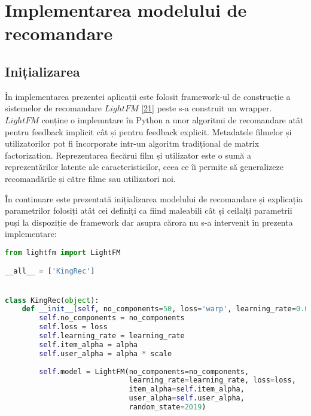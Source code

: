 \section{Implementarea modelului de recomandare}
\subsection{Inițializarea}
În implementarea prezentei aplicații este folosit framework-ul de construcție a sistemelor de recomandare $LightFM$ \hyperlink{lightfm}{[21]} peste s-a construit un wrapper. 
$LightFM$ conține o implemntare în Python a unor algoritmi de recomandare atât pentru feedback implicit cât și pentru feedback explicit. Metadatele filmelor și utilizatorilor pot fi încorporate intr-un algoritm tradițional de matrix factorization. Reprezentarea fiecărui film și utilizator este o sumă a reprezentărilor latente ale caracteristicilor, ceea ce îi permite să generalizeze recomandările și către filme sau utilizatori noi.   

În continuare este prezentată inițializarea modelului de recomandare și explicația parametrilor folosiți atât cei definiți ca fiind maleabili cât și ceilalți parametrii puși la dispoziție de framework dar asupra cărora nu s-a intervenit în prezenta implementare:
\begin{lstlisting}[language=Python, caption=Definirea modelului de recomandare]
from lightfm import LightFM

__all__ = ['KingRec']


class KingRec(object):
    def __init__(self, no_components=50, loss='warp', learning_rate=0.05, alpha=0.02, scale=0.07):
        self.no_components = no_components
        self.loss = loss
        self.learning_rate = learning_rate
        self.item_alpha = alpha
        self.user_alpha = alpha * scale
        
        self.model = LightFM(no_components=no_components, 
        					 learning_rate=learning_rate, loss=loss,
                             item_alpha=self.item_alpha, 
                             user_alpha=self.user_alpha, 
                             random_state=2019)                       
\end{lstlisting}

